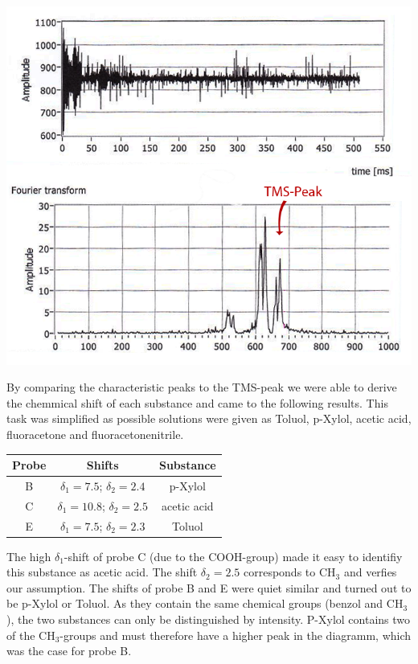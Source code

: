\documentclass[12pt, english]{scrartcl} %
\begin{document}
\begin{multicols}{2}
 

\begin{center}
\includegraphics[width=\columnwidth]{graphics/ft.png}
\label{probe B}
\end{center}
 
By comparing the characteristic peaks to the TMS-peak we were able to derive the chemmical shift of each substance and came to the following results. This task was simplified as possible solutions were given as Toluol, p-Xylol, acetic acid, fluoracetone and fluoracetonenitrile.

\begin{center}
\begin{tabular}{|c|c|c|}
\hline 
Probe & Shifts & Substance \\ 
\hline 
B & $\delta_1=7.5$; $\delta_2=2.4$ & p-Xylol \\ 
\hline 
C & $\delta_1=10.8$; $\delta_2=2.5$ & acetic acid \\ 
\hline 
E & $\delta_1=7.5$; $\delta_2=2.3$ & Toluol \\ 
\hline 
\end{tabular} 
\end{center}

The high $\delta_1$-shift of probe C (due to the COOH-group) made it easy to identifiy this substance as acetic acid. The shift $\delta_2=2.5$ corresponds to CH$_3$ and verfies our assumption. The shifts of probe B and E were quiet similar and turned out to be p-Xylol or Toluol. As they contain the same chemical groups (benzol and CH$_3$), the two substances can only be distinguished by intensity. P-Xylol contains two of the  CH$_3$-groups and must therefore have a higher peak in the diagramm, which was the case for probe B.


\end{multicols}
\end{document}
